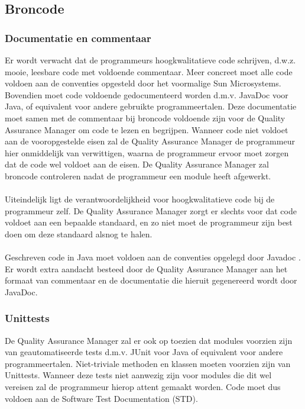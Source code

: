 \subsection{Broncode}
\subsubsection{Documentatie en commentaar}
Er wordt verwacht dat de programmeurs hoogkwalitatieve code schrijven, d.w.z. mooie, leesbare code met voldoende commentaar. 
Meer concreet moet alle code voldoen aan de conventies opgesteld door het voormalige Sun Microsystems\cite{JavaCodeConventions}.
Bovendien moet code voldoende gedocumenteerd worden d.m.v. JavaDoc\cite{Javadoc} voor Java, of equivalent voor andere gebruikte programmeertalen. 
Deze documentatie moet samen met de commentaar bij broncode voldoende zijn voor de Quality Assurance Manager om code te lezen en begrijpen. 
Wanneer code niet voldoet aan de vooropgestelde eisen zal de Quality Assurance Manager de programmeur hier onmiddelijk van verwittigen, waarna de programmeur ervoor moet zorgen dat de code wel voldoet aan de eisen. 
De Quality Assurance Manager zal broncode controleren nadat de programmeur een module heeft afgewerkt. 
\\
\\
Uiteindelijk ligt de verantwoordelijkheid voor hoogkwalitatieve code bij de programmeur zelf. 
De Quality Assurance Manager zorgt er slechts voor dat code voldoet aan een bepaalde standaard, en zo niet moet de programmeur zijn best doen om deze standaard alsnog te halen. 
\\
\\
Geschreven code in Java moet voldoen aan de conventies opgelegd door Javadoc \cite{JavadocConventions}. 
Er wordt extra aandacht besteed door de Quality Assurance Manager aan het formaat van commentaar en de documentatie die hieruit gegenereerd wordt door JavaDoc. 

\subsubsection{Unittests}
De Quality Assurance Manager zal er ook op toezien dat modules voorzien zijn van geautomatiseerde tests d.m.v. JUnit voor Java of equivalent voor andere programmeertalen. 
Niet-triviale methoden en klassen moeten voorzien zijn van Unittests. 
Wanneer deze tests niet aanwezig zijn voor modules die dit wel vereisen zal de programmeur hierop attent gemaakt worden. 
Code moet dus voldoen aan de Software Test Documentation (STD). 

